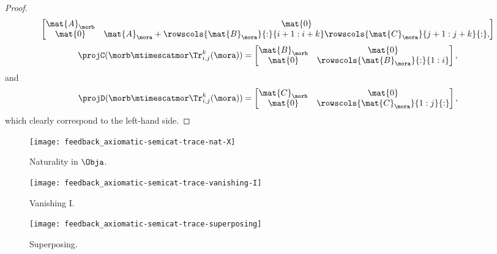 {\begin{proof}
\begin{equation*}
\begin{bmatrix}
\mat{A}_\morb&\mat{0}\\
\mat{0}&\mat{A}_\mora + \rowscols{\mat{B}_\mora}{:}{i+1:i+k} \rowscols{\mat{C}_\mora}{j+1:j+k}{:},
\end{bmatrix}
\end{equation*}
%
\begin{equation*}
\projC(\morb \mtimescatmor \Tr_{i,j}^k(\mora))=\begin{bmatrix}
\mat{B}_\morb&\mat{0}\\
\mat{0}&\rowscols{\mat{B}_\mora}{:}{1:i}
\end{bmatrix},
\end{equation*}
and 
\begin{equation*}
\projD(\morb \mtimescatmor \Tr_{i,j}^k(\mora))=
\begin{bmatrix}
\mat{C}_\morb&\mat{0}\\
\mat{0}&\rowscols{\mat{C}_\mora}{1:j}{:}
\end{bmatrix},
\end{equation*}
which clearly correspond to the left-hand side.
\end{proof}
}



\begin{figure}[h!]
    \centering
    \texttt{[image: feedback\_axiomatic-semicat-trace-nat-X]}
    \caption{Naturality in $\Obja$.}
    \label{fig:axiomatic-semicat-trace-nat-X}
\end{figure}

\begin{figure}[h!]
    \centering
    \texttt{[image: feedback\_axiomatic-semicat-trace-vanishing-I]}
    \caption{Vanishing I.}
    \label{fig:axiomatic-semicat-trace-vanishing-I}
\end{figure}

\begin{figure}[h!]
    \centering
    \texttt{[image: feedback\_axiomatic-semicat-trace-superposing]}
    \caption{Superposing.}
    \label{fig:axiomatic-semicat-trace-superposing}
\end{figure}

